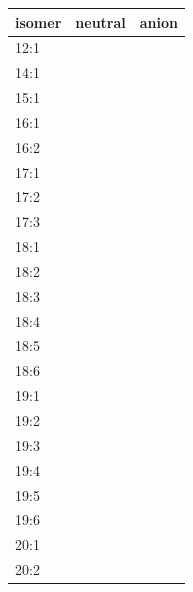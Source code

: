 \begin{figure}\centering
	\begin{tabular}{lp{3cm}|p{3cm}}\toprule
		isomer  & \multicolumn{1}{c}{neutral} & \multicolumn{1}{c}{anion} \\ \midrule
		12:1    & \cellcolor{myorange}        & \cellcolor{myorange}      \\
		14:1    & \cellcolor{mygreen}         & \cellcolor{mygreen}       \\
		15:1    & \cellcolor{mygreen}         & \cellcolor{mygreen}       \\
		16:1    & \cellcolor{mygreen}         & \cellcolor{mygreen}       \\
		16:2    & \cellcolor{mygreen}         & \cellcolor{mygreen}       \\
		17:1    & \cellcolor{myorange}        & \cellcolor{mygreen}       \\
		17:2    & \cellcolor{mygreen}         & \cellcolor{mygreen}       \\
		17:3    & \cellcolor{mygreen}         & \cellcolor{mygreen}       \\
		18:1    & \cellcolor{mygreen}         & \cellcolor{mygreen}       \\
		18:2    & \cellcolor{mygreen}         & \cellcolor{mygreen}       \\
		18:3    & \cellcolor{mygreen}         & \cellcolor{myorange}      \\
		18:4    & \cellcolor{mygreen}         & \cellcolor{mygreen}       \\
		18:5    & \cellcolor{mygreen}         & \cellcolor{mygreen}       \\
		18:6    & \cellcolor{mygreen}         & \cellcolor{mygreen}       \\
		19:1    & \cellcolor{mygreen}         & \cellcolor{myorange}      \\
		19:2    & \cellcolor{mygreen}         & \cellcolor{myorange}      \\
		19:3    & \cellcolor{mygreen}         & \cellcolor{mygreen}       \\
		19:4    & \cellcolor{mygreen}         & \cellcolor{myorange}      \\
		19:5    & \cellcolor{mygreen}         & \cellcolor{myorange}      \\
		19:6    & \cellcolor{mygreen}         & \cellcolor{mygreen}       \\
		20:1    & \cellcolor{myorange}        & \cellcolor{myorange}      \\
		20:2    & \cellcolor{mygreen}         & \cellcolor{mygreen}       \\

\end{tabular}
\end{figure}
